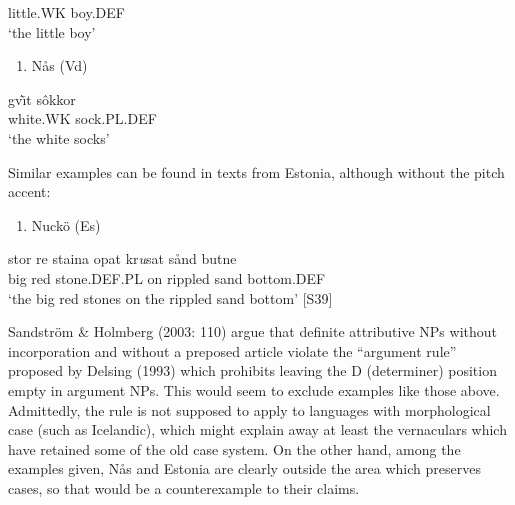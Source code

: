 little.WK  boy.DEF\\ %


‘the little boy’
\z


\begin{enumerate} %
\item 
\label{bkm:Ref140985846}Nås (Vd)

\end{enumerate} %
\ea\label{}
\gll gv\`{\=\i}t  sôkkor\\


white.WK  sock.PL.DEF\\ %


‘the white socks’
\z


Similar examples can be found in texts from Estonia, although without the pitch accent:

\begin{enumerate} %
\item 
Nuckö (Es)

\end{enumerate} %
\ea\label{}
\gll stor  re  staina  opat  kr\textit{u}sat  sånd  butne\\


big  red  stone.DEF.PL  on  rippled  sand  bottom.DEF\\ %


‘the big red stones on the rippled sand bottom’ [S39]
\z

Sandström \& Holmberg (2003: 110) argue that definite attributive NPs without incorporation and without a preposed article violate the “argument rule” proposed by Delsing (1993) which prohibits leaving the D (determiner) position empty in argument NPs. This would seem to exclude examples like those above. Admittedly, the rule is not supposed to apply to languages with morphological case (such as Icelandic), which might explain away at least the vernaculars which have retained some of the old case system. On the other hand, among the examples given, Nås and Estonia are clearly outside the area which preserves cases, so that would be a counterexample to their claims. 

